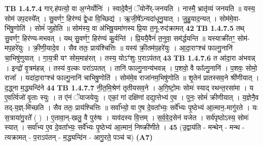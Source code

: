 \documentclass[17pt]{extarticle}
\begin{document}
                                \textbf{ TB 1.4.7.4} \newline
                  गार्.ह॑पत्यो॒ वा अ॒ग्नेर्योनिः॑ । स्वादे॒वैनं॒ ॅयोने᳚र्-जनयति । नास्मै॒ भ्रातृ॑व्यं जनयति ॥ यस्य॒ सोम॑ उप॒दस्ये᳚त् । सु॒वर्णꣳ॒॒ हिर॑ण्यं द्वे॒धा वि॒च्छिद्य॑ । ऋ॒जी॒षे᳚ऽन्यदा॑धूनु॒यात् । जु॒हु॒याद॒न्यत् । सोम॑मे॒वा-भि॑षु॒णोति॑ । सोमं॑ जुहोति ॥ सोम॑स्य॒ वा अ॑भिषू॒यमा॑णस्य प्रि॒या त॒नू-रुद॑क्रामत् \textbf{ 42} \newline
                  \newline
                                \textbf{ TB 1.4.7.5} \newline
                  तथ् सु॒वर्णꣳ॒॒ हिर॑ण्य-मभवत् । यथ् सु॒वर्णꣳ॒॒ हिर॑ण्यं कु॒र्वन्ति॑ । प्रि॒ययै॒वैनं॑ त॒नुवा॒ सम॑र्द्धयन्ति ॥ यस्याक्री॑तꣳ॒॒ सोम॑-मप॒हरे॑युः । क्री॒णी॒यादे॒व । सैव ततः॒ प्राय॑श्चित्तिः ॥ यस्य॑ क्री॒तम॑प॒हरे॑युः । आ॒दा॒राꣳश्च॑ फाल्गु॒नानि॑ चा॒भिषु॑णुयात् । गा॒य॒त्री यꣳ सोम॒माह॑रत् । तस्य॒ योऽꣳ॑शुः प॒राऽप॑तत् \textbf{ 43} \newline
                  \newline
                                \textbf{ TB 1.4.7.6} \newline
                  त आ॑दा॒रा अ॑भवन्न् । इन्द्रो॑ वृ॒त्रम॑हन्न् । तस्य॑ व॒ल्कः परा॑ऽपतत् । तानि॑ फाल्गु॒नान्य॑भवन्न् । प॒शवो॒ वै फा᳚ल्गु॒नानि॑ । प॒शवः॒ सोमो॒ राजा᳚ । यदा॑दा॒राꣳश्च॑ फाल्गु॒नानि॑ चाभिषु॒णोति॑ । सोम॑मे॒व राजा॑नम॒भिषु॑णोति ॥ शृ॒तेन॑ प्रातस्सव॒ने श्री॑णीयात् । द॒द्ध्ना म॒द्ध्यन्दि॑ने \textbf{ 44} \newline
                  \newline
                                \textbf{ TB 1.4.7.7} \newline
                  नी॒त॒मि॒श्रेण॑ तृतीयसव॒ने । अ॒गि॒ष्टो॒मः सोमः॑ स्याद् रथन्त॒रसा॑मा । य ए॒वर्त्विजो॑ वृ॒ताः स्युः । त ए॑नं ॅयाजयेयुः । एकां॒ गां दक्षि॑णां दद्या॒त्तेभ्य॑ ए॒व । पुनः॒ सोमं॑ क्रीणीयात् । य॒ज्ञेनै॒व तद्-य॒ज्ञ्-मि॑च्छति । सैव ततः॒ प्राय॑श्चित्तिः ॥ सर्वा᳚भ्यो॒ वा ए॒ष दे॒वता᳚भ्यः॒ सर्वे᳚भ्यः पृ॒ष्ठेभ्य॑ आ॒त्मान॒-मागु॑रते । यः स॒त्राया॑गु॒रते᳚ ( ) । ए॒तावा॒न्-खलु॒ वै पुरु॑षः । याव॑दस्य वि॒त्तम् । स॒र्व॒वे॒द॒सेन॑ यजेत । सर्व॑पृष्ठोऽस्य॒ सोमः॑ स्यात् । सर्वा᳚भ्य ए॒व दे॒वता᳚भ्यः॒ सर्वे᳚भ्यः पृ॒ष्ठेभ्य॑ आ॒त्मानं॒ निष्क्री॑णीते । \textbf{ 45} \newline
                  \newline
                                    (उ॒द्वाय॑ति - मन्थेन् - मन्थ - त्यक्रामत् - प॒राऽप॑तन् - म॒द्ध्यन्दि॑न - आगु॒रते॒ पञ्च॑ च) \textbf{(A7)} \newline \newline
\end{document}
